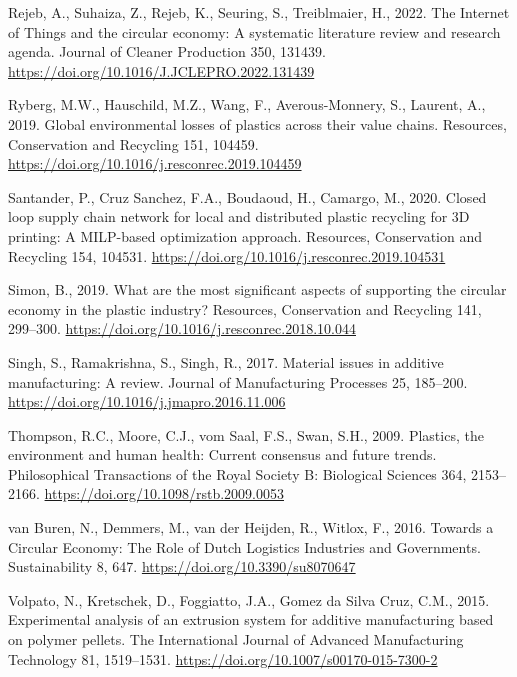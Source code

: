 \documentclass[
  11pt,
]{article}
\newlength{\cslhangindent}
\newlength{\cslentryspacingunit} %
\newenvironment{CSLReferences}[2] %
 {%
  \setlength{\parindent}{0pt}
  \ifodd #1
  \let\oldpar\par
  \def\par{\hangindent=\cslhangindent\oldpar}
  \fi
  \setlength{\parskip}{#2\cslentryspacingunit}
 }%
 {}
\begin{document}
\begin{CSLReferences}{1}{0}
\leavevmode{}%
Rejeb, A., Suhaiza, Z., Rejeb, K., Seuring, S., Treiblmaier, H., 2022.
The {Internet} of {Things} and the circular economy: {A} systematic
literature review and research agenda. Journal of Cleaner Production
350, 131439. \url{https://doi.org/10.1016/J.JCLEPRO.2022.131439}

\leavevmode{}%
Ryberg, M.W., Hauschild, M.Z., Wang, F., Averous-Monnery, S., Laurent,
A., 2019. Global environmental losses of plastics across their value
chains. Resources, Conservation and Recycling 151, 104459.
\url{https://doi.org/10.1016/j.resconrec.2019.104459}

\leavevmode{}%
Santander, P., Cruz Sanchez, F.A., Boudaoud, H., Camargo, M., 2020.
Closed loop supply chain network for local and distributed plastic
recycling for {3D} printing: A {MILP-based} optimization approach.
Resources, Conservation and Recycling 154, 104531.
\url{https://doi.org/10.1016/j.resconrec.2019.104531}

\leavevmode{}%
Simon, B., 2019. What are the most significant aspects of supporting the
circular economy in the plastic industry? Resources, Conservation and
Recycling 141, 299--300.
\url{https://doi.org/10.1016/j.resconrec.2018.10.044}

\leavevmode{}%
Singh, S., Ramakrishna, S., Singh, R., 2017. Material issues in additive
manufacturing: {A} review. Journal of Manufacturing Processes 25,
185--200. \url{https://doi.org/10.1016/j.jmapro.2016.11.006}

\leavevmode{}%
Thompson, R.C., Moore, C.J., vom Saal, F.S., Swan, S.H., 2009. Plastics,
the environment and human health: Current consensus and future trends.
Philosophical Transactions of the Royal Society B: Biological Sciences
364, 2153--2166. \url{https://doi.org/10.1098/rstb.2009.0053}

\leavevmode{}%
van Buren, N., Demmers, M., van der Heijden, R., Witlox, F., 2016.
Towards a {Circular Economy}: {The Role} of {Dutch Logistics Industries}
and {Governments}. Sustainability 8, 647.
\url{https://doi.org/10.3390/su8070647}

\leavevmode{}%
Volpato, N., Kretschek, D., Foggiatto, J.A., Gomez da Silva Cruz, C.M.,
2015. Experimental analysis of an extrusion system for additive
manufacturing based on polymer pellets. The International Journal of
Advanced Manufacturing Technology 81, 1519--1531.
\url{https://doi.org/10.1007/s00170-015-7300-2}


\end{CSLReferences}
\end{document}
